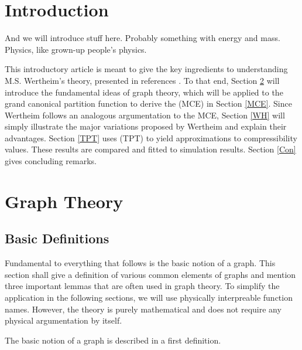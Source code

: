 \documentclass[8.5pt,twoside,twocolumn]{article}
\theoremstyle{standard}
\begin{document}
\section{Introduction}
And we will introduce stuff here. Probably something with energy and mass. Physics, like grown-up people's physics.

This introductory article is meant to give the key ingredients to understanding M.S. Wertheim's theory, presented in
references \cite{Wertheim1}\cite{Wertheim2}\cite{Wertheim3}\cite{Wertheim4}\cite{WertheimTPT}. To that end, Section \ref{GrT}
will introduce the fundamental ideas of graph theory, which will be applied to the grand canonical partition function
to derive the  (MCE) in Section \ref{MCE}. Since Wertheim follows an analogous argumentation to the
MCE, Section \ref{WH} will simply illustrate the major variations proposed by Wertheim and explain their advantages. Section
\ref{TPT} uses  (TPT) to yield approximations to compressibility values. These results are
compared and fitted to simulation results. Section \ref{Con} gives concluding remarks.




\section{Graph Theory}
\label{GrT}
\subsection{Basic Definitions}
Fundamental to everything that follows is the basic notion of a graph. This
section shall give a definition of various common elements of graphs and
mention three important lemmas that are often used in graph theory. To simplify
the application in the following sections, we will use physically interpreable
function names. However, the theory is purely mathematical and does not require
any physical argumentation by itself.

The basic notion of a graph is described in a first definition.
\end{document}
